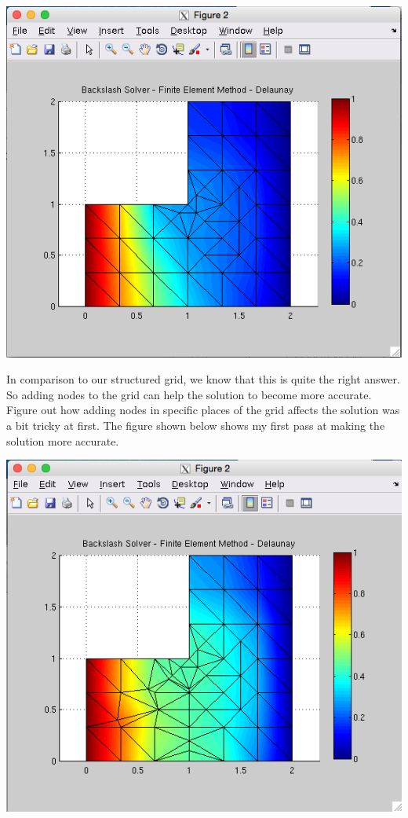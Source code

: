 \documentclass[11pt, oneside]{article}   	%
\begin{document}
\vspace{5mm}

\centerline{\includegraphics[scale = 0.55]{FEM_unstructured_1.png}}

\vspace{5mm}

In comparison to our structured grid, we know that this is quite the right answer. So adding nodes to the grid can help the solution to become more accurate. Figure out how adding nodes in specific places of the grid affects the solution was a bit tricky at first. The figure shown below shows my first pass at making the solution more accurate. \\

\centerline{\includegraphics[scale = 0.55]{FEM_unstructured_2.png}}
\end{document}
